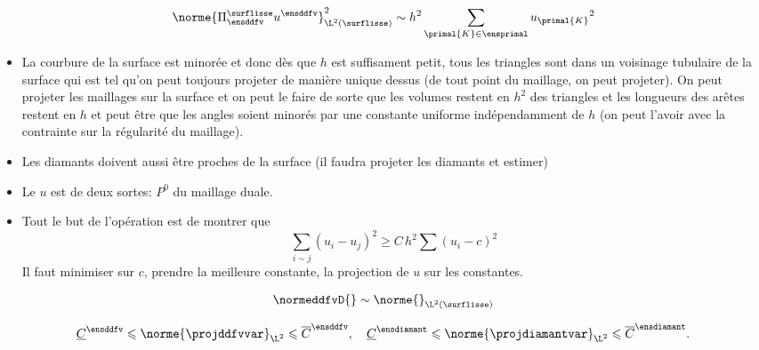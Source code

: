 \newpage

\begin{prop}
\[
\norme{\Pi^\surflisse_\ensddfv u^\ensddfv}^2_{\L^2(\surflisse)} \sim h^2 \sum_{\primal{K} \in \ensprimal} u_{\primal{K}}{}^2
\]
\end{prop} 

\begin{envide}
{\color{blue}
\begin{itemize}
    \item La courbure de la surface est minorée et donc dès que $h$ est suffisament petit, tous les triangles sont dans un voisinage tubulaire de la surface qui est tel qu'on peut toujours projeter de manière unique dessus (de tout point du maillage, on peut projeter). On peut projeter les maillages sur la surface et on peut le faire de sorte que les volumes restent en $h^2$ des triangles et les longueurs des arêtes restent en $h$ et peut être que les angles soient minorés par une constante uniforme indépendamment de $h$ (on peut l'avoir avec la contrainte sur la régularité du maillage).
    \item Les diamants doivent aussi être proches de la surface (il faudra projeter les diamants et estimer)
    \item Le $u$ est de deux sortes: $P^0$ du maillage duale. 
    \item Tout le but de l'opération est de montrer que
    \begin{equation}\label{eq:inegdegraphe}
    \boxed{
    \sum_{i \sim j} (u_i - u_j)^2 \geqslant C \, h^2 \sum (u_i - c)^2
    }
    \end{equation}
    Il faut minimiser sur $c$, prendre la meilleure constante, la projection de $u$ sur les constantes.
\end{itemize}
}
\end{envide}


\begin{prop}
\[
\normeddfvD{} \sim \norme{}_{\L^2(\surflisse)}   
\]
\end{prop}

\begin{prop}
\begin{equation}
\underline{C}^\ensddfv \leqslant \norme{\projddfvvar}_{\L^2} \leqslant \overline{C}^\ensddfv,
\quad
\underline{C}^\ensdiamant \leqslant \norme{\projdiamantvar}_{\L^2} \leqslant \overline{C}^\ensdiamant.
\end{equation}
\end{prop}

